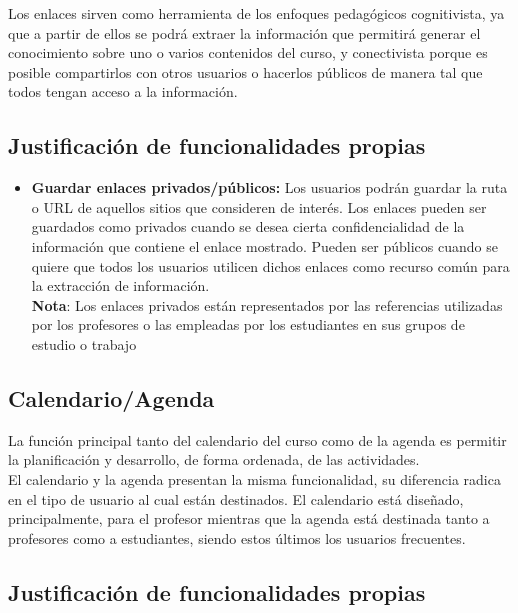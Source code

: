 Los enlaces sirven como herramienta de los enfoques pedagógicos cognitivista, ya que a partir de ellos se podrá extraer la información que permitirá generar el conocimiento sobre uno o varios contenidos del curso, y conectivista porque es posible compartirlos con otros usuarios o hacerlos públicos de manera tal que todos tengan acceso a la información.

\subsection*{Justificación de funcionalidades propias}

\begin{itemize}

\item \textbf{Guardar enlaces privados/públicos:} Los usuarios podrán guardar la ruta o URL de aquellos sitios que consideren de interés. Los enlaces pueden ser guardados como privados cuando se desea cierta confidencialidad de la información que contiene el enlace mostrado. Pueden ser públicos cuando se quiere que todos los usuarios utilicen dichos enlaces como recurso común para la extracción de información.\\
\textbf{Nota}: Los enlaces privados están representados por las referencias utilizadas por los profesores o las empleadas por los estudiantes en sus grupos de estudio o trabajo

\end{itemize}
\subsection{Calendario/Agenda}

La función principal tanto del calendario del curso como de la agenda es permitir la planificación y desarrollo, de forma ordenada, de las actividades.\\

El calendario y la agenda presentan la misma funcionalidad, su diferencia radica en el tipo de usuario al cual están destinados. El calendario está diseñado, principalmente, para el profesor mientras que la agenda está destinada tanto a profesores como a estudiantes, siendo estos últimos los usuarios frecuentes.

\subsection*{Justificación de funcionalidades propias}

